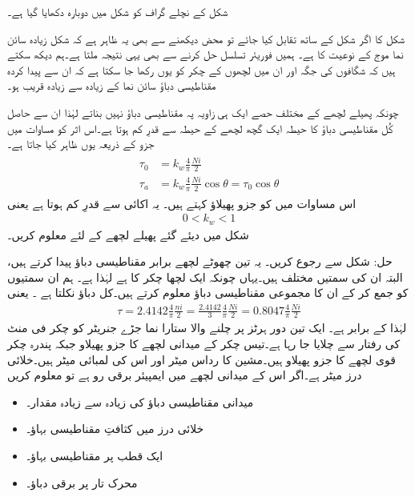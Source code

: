 شکل  کے نچلے گراف کو شکل  میں دوبارہ دکھایا گیا ہے۔

شکل  کا اگر شکل  کے ساتھ تقابل کیا جائے تو محض دیکھنے سے بھی یہ ظاہر ہے کہ شکل   زیادہ سائن نما موج کے نوعیت کا ہے۔ ہمیں فوریئر تسلسل حل کرنے سے بھی یہی نتیجہ ملتا ہے۔ہم دیکھ سکتے ہیں کہ  شگافوں کی جگہ اور ان میں لچھوں کے چکر کو یوں رکھا جا سکتا ہے کہ ان سے پیدا کردہ مقناطیسی دباؤ سائن نما کے زیادہ سے زیادہ قریب ہو۔

چونکہ پھیلے لچھے کے مختلف حصے ایک ہی زاویہ پہ مقناطیسی دباؤ نہیں بناتے لہٰذا ان سے حاصل کُل مقناطیسی دباؤ کا حیطہ ایک گچھ لچھے  کے حیطہ سے قدرِ کم ہوتا ہے۔اس اثر کو مساوات میں جزو  کے ذریعہ یوں ظاہر کیا جاتا ہے۔
\begin{gather}
\begin{aligned}
\tau_0&=k_w \frac{4}{\pi}\frac{N i}{2}\\
\tau_{a}&=k_w \frac{4}{\pi}\frac{N i}{2} \cos \theta=\tau_0 \cos \theta
\end{aligned}
\end{gather}
اس مساوات میں  کو جزو  پھیلاؤ  کہتے ہیں۔ یہ  اکائی سے قدرِ کم ہوتا ہے یعنی
\begin{align}
0<k_w<1
\end{align}
%
شکل  میں دیئے گئے پھیلے لچھے کے لئے  معلوم کریں۔

حل: شکل  سے رجوع کریں۔ یہ تین چھوٹے لچھے برابر مقناطیسی دباؤ  پیدا کرتے ہیں، البتہ ان کی سمتیں مختلف ہیں۔یہاں چونکہ ایک لچھا   چکر کا ہے لہٰذا  ہے۔ ہم ان سمتیوں کو جمع کر کے ان کا مجموعی مقناطیسی دباؤ  معلوم کرتے ہیں۔کل دباؤ  نکلتا ہے ۔ یعنی
\begin{align*}
\tau=2.4142 \frac{4}{\pi}\frac{ni}{2}=\frac{2.4142}{3} \frac{4}{\pi}\frac{N i}{2}=0.8047 \frac{4}{\pi}\frac{N i}{2}
\end{align*}
لہٰذا  کے برابر ہے۔
%
ایک تین دور  ہرٹز پر چلنے والا ستارا نما جڑے جنریٹر کو   چکر فی منٹ کی رفتار سے چلایا جا رہا ہے۔تیس چکر کے میدانی لچھے  کا جزو پھیلاو  جبکہ پندرہ چکر قوی لچھے کا جزو پھیلاو  ہیں۔مشین کا رداس  میٹر اور اس  کی لمبائی  میٹر ہیں۔خلائی درز  میٹر ہے۔اگر اس کے میدانی لچھے میں   ایمپیئر برقی رو ہے تو معلوم کریں
\begin{itemize}
\item
میدانی مقناطیسی دباؤ کی زیادہ سے زیادہ مقدار۔
\item
خلائی درز میں کثافتِ مقناطیسی بہاؤ۔
\item
ایک قطب پر مقناطیسی بہاؤ۔
\item
محرک تار پر برقی دباؤ۔
\end{itemize}

